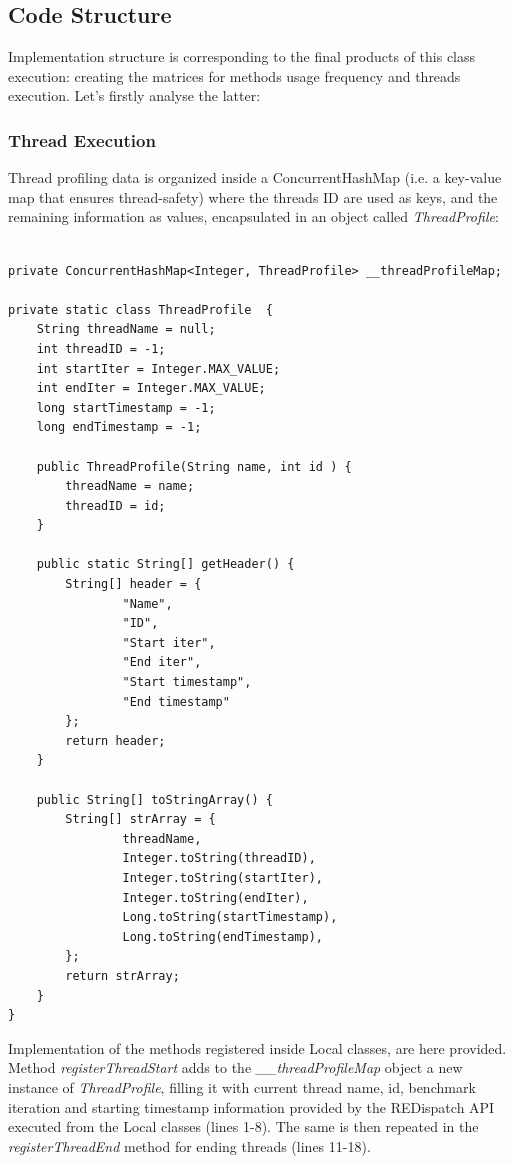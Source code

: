 \documentclass[]{usiinfthesis}
\begin{document}
\subsection{Code Structure}
Implementation structure is corresponding to the final products of this class execution: creating the matrices for methods usage frequency and threads execution. Let's firstly analyse the latter:

\subsubsection{Thread Execution}
Thread profiling data is organized inside a ConcurrentHashMap (i.e. a key-value map that ensures thread-safety) where the threads ID are used as keys, and the remaining information as values, encapsulated in an object called \textit{ThreadProfile}:

    \vspace*{0.25cm}
        \begin{verbatim}

private ConcurrentHashMap<Integer, ThreadProfile> __threadProfileMap;
        
private static class ThreadProfile  {
    String threadName = null;
    int threadID = -1;
    int startIter = Integer.MAX_VALUE;
    int endIter = Integer.MAX_VALUE;
    long startTimestamp = -1;
    long endTimestamp = -1;

    public ThreadProfile(String name, int id ) {
        threadName = name;
        threadID = id;
    }

    public static String[] getHeader() {
        String[] header = {
                "Name",
                "ID",
                "Start iter",
                "End iter",
                "Start timestamp",
                "End timestamp"
        };
        return header;
    }

    public String[] toStringArray() {
        String[] strArray = {
                threadName,
                Integer.toString(threadID),
                Integer.toString(startIter),
                Integer.toString(endIter),
                Long.toString(startTimestamp),
                Long.toString(endTimestamp),
        };
        return strArray;
    }
}
    \end{verbatim}
    \vspace*{0.25cm}
    
    \noindent
    Implementation of the methods registered inside Local classes, are here provided. Method \textit{registerThreadStart} adds to the\textit{ \_\_threadProfileMap} object a new instance of \textit{ThreadProfile}, filling it with current thread name, id, benchmark iteration and starting timestamp information provided by the REDispatch API executed from the Local classes (lines 1-8). The same is then repeated in the \textit{registerThreadEnd} method for ending threads (lines 11-18).
    
\end{document}

